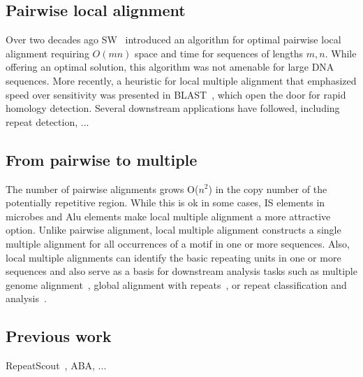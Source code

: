 \documentclass{llncs}
\begin{document}
\subsection{ Pairwise local alignment}
Over two decades ago SW~\cite{ref-sw} introduced an algorithm for optimal pairwise local alignment requiring $O(mn)$ space and time for sequences of lengths $m,n$. While offering an optimal solution, this algorithm was not amenable for large DNA sequences. More recently, a heuristic for local multiple alignment that emphasized speed over sensitivity was presented in  BLAST~\cite{...}, which open the door for rapid homology detection. Several downstream applications have followed, including repeat detection, ...

\subsection{ From pairwise to multiple}
The number of pairwise alignments grows O($n^{2}$) in the copy number of the potentially repetitive region. While this is ok in some cases, IS elements in microbes and Alu elements make local multiple alignment a more attractive option.
Unlike pairwise alignment, local multiple alignment constructs a
single multiple alignment for all occurrences of a motif in one or
more sequences.  Also, local multiple alignments
can identify the basic repeating units in one or more sequences and also 
serve as a basis for downstream analysis tasks such as multiple genome
alignment~\cite{ref-mauve,ref-mga,ref-mgcat,ref-deweyReview}, global
alignment with repeats~\cite{ref-otherSammethPaper,ref-aba}, or
repeat classification and analysis~\cite{ref-piler}. 

\subsection{Previous work}
RepeatScout~\cite{ref-repeatscout}, ABA, ...

\label{sec:overview}
\end{document}
